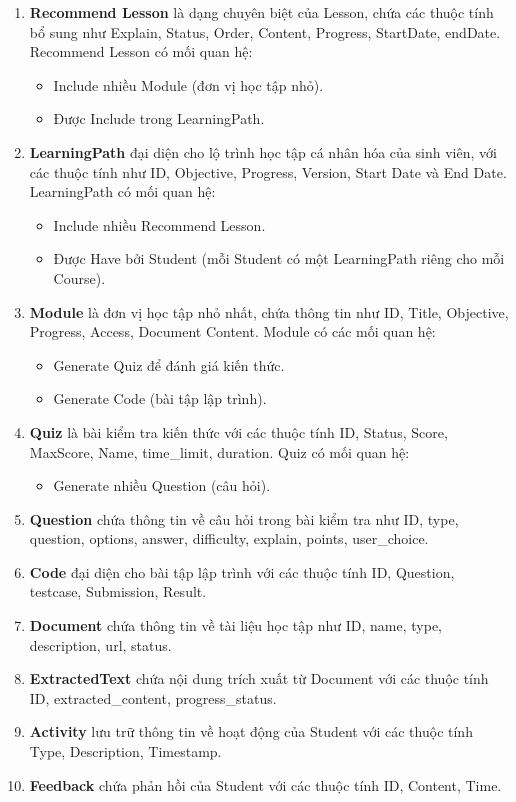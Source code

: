 \begin{enumerate}
\item \textbf{Recommend Lesson} là dạng chuyên biệt của Lesson, chứa các thuộc tính bổ sung như Explain, Status, Order, Content, Progress, StartDate, endDate. Recommend Lesson có mối quan hệ:
\begin{itemize}
    \item Include nhiều Module (đơn vị học tập nhỏ).
    \item Được Include trong LearningPath.
\end{itemize}

\item \textbf{LearningPath} đại diện cho lộ trình học tập cá nhân hóa của sinh viên, với các thuộc tính như ID, Objective, Progress, Version, Start Date và End Date. LearningPath có mối quan hệ:
\begin{itemize}
    \item Include nhiều Recommend Lesson.
    \item Được Have bởi Student (mỗi Student có một LearningPath riêng cho mỗi Course).
\end{itemize}

\item \textbf{Module} là đơn vị học tập nhỏ nhất, chứa thông tin như ID, Title, Objective, Progress, Access, Document Content. Module có các mối quan hệ:
\begin{itemize}
    \item Generate Quiz để đánh giá kiến thức.
    \item Generate Code (bài tập lập trình).
\end{itemize}

\item \textbf{Quiz} là bài kiểm tra kiến thức với các thuộc tính ID, Status, Score, MaxScore, Name, time\_limit, duration. Quiz có mối quan hệ:
\begin{itemize}
    \item Generate nhiều Question (câu hỏi).
\end{itemize}

\item \textbf{Question} chứa thông tin về câu hỏi trong bài kiểm tra như ID, type, question, options, answer, difficulty, explain, points, user\_choice.

\item \textbf{Code} đại diện cho bài tập lập trình với các thuộc tính ID, Question, testcase, Submission, Result.

\item \textbf{Document} chứa thông tin về tài liệu học tập như ID, name, type, description, url, status.

\item \textbf{ExtractedText} chứa nội dung trích xuất từ Document với các thuộc tính ID, extracted\_content, progress\_status.

\item \textbf{Activity} lưu trữ thông tin về hoạt động của Student với các thuộc tính Type, Description, Timestamp.

\item \textbf{Feedback} chứa phản hồi của Student với các thuộc tính ID, Content, Time.
\end{enumerate}
